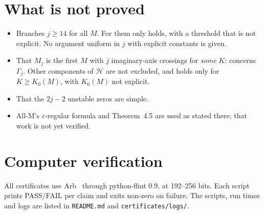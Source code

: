 \documentclass[11pt,a4paper]{report}
\begin{document}
\section{What is not proved}

\begin{itemize}
\item Branches \(j\ge14\) for all \(M\). For them only  holds, with a threshold that is not explicit. No
argument uniform in \(j\) with explicit constants is given.
\item That \(M_j\) is the first \(M\) with \(j\) imaginary-axis crossings for \emph{some} \(K\):  concerns
\(\Gamma_j\). Other components of \(\mathcal H\) are not excluded, and  holds only for \(K\ge K_0(M)\),
with \(K_0(M)\) not explicit.
\item That the \(2j-2\) unstable zeros are simple.
\item All-M's \(\varepsilon\)-regular formula and Theorem~4.5 are used as stated there; that work is not yet verified.
\end{itemize}

\section{Computer verification}

All certificates use Arb~\autocite{Johansson2017} through python-flint 0.9, at 192--256 bits. Each script prints
PASS/FAIL per claim and exits non-zero on failure. The scripts, run times and logs are listed in \texttt{README.md}
and \texttt{certificates/logs/}.

\paperreferences
\end{document}
